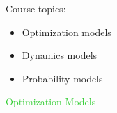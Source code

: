 \documentclass{workbook}
\begin{document}
\begin{slide}

\begin{parts}
\setcounter{partsitem}{2}

	\item Course topics:

\begin{itemize}
	\item Optimization models
	\item Dynamics models
	\item Probability models
\end{itemize}
	
\end{parts}

\end{slide}




%
%
%
%




\begin{slide}

\begin{slidesonly}
	\vspace{3cm}
\end{slidesonly}

\begin{center}
\Huge 
\textcolor{LimeGreen}{Optimization Models}
\end{center}

	
\end{slide}
\end{document}
